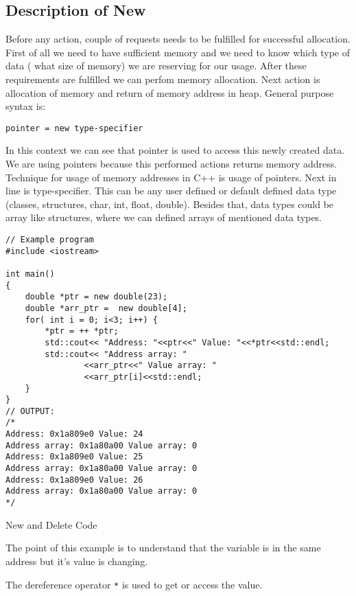 \documentclass[11pt, a4paper]{article}
\begin{document}
\subsection{Description of New}%
\label{sub:description_of_new}

Before any action, couple of requests needs to be fulfilled for successful allocation. First of all we need to have sufficient memory and we need to know which type of data ( what size of memory) we are reserving for our usage. After these requirements are fulfilled we can perfom memory allocation. Next action is allocation of memory and return of memory address in heap.
General purpose syntax is:

\texttt{pointer = new type-specifier} 

In this context we can see that pointer is used to access this newly created data. We are using pointers because this performed actions returns memory address. Technique for usage of memory addresses in C++ is usage of pointers. Next in line is type-specifier. This can be any user defined or default defined data type (classes, structures, char, int, float, double). Besides that, data types could be array like structures, where we can defined arrays of mentioned data types.


\begin{listing}
\begin{verbatim}
// Example program
#include <iostream>

int main()
{
    double *ptr = new double(23);
    double *arr_ptr =  new double[4];
    for( int i = 0; i<3; i++) {
        *ptr = ++ *ptr;
        std::cout<< "Address: "<<ptr<<" Value: "<<*ptr<<std::endl;
        std::cout<< "Address array: "
				<<arr_ptr<<" Value array: "
				<<arr_ptr[i]<<std::endl;
    }
}
// OUTPUT: 
/*
Address: 0x1a809e0 Value: 24
Address array: 0x1a80a00 Value array: 0
Address: 0x1a809e0 Value: 25
Address array: 0x1a80a00 Value array: 0
Address: 0x1a809e0 Value: 26
Address array: 0x1a80a00 Value array: 0
*/
\end{verbatim}
\caption{New and Delete Code}
\label{lst:new_and_delete}
\end{listing}


The point of this example is to understand that the variable is in the same address but it's value is changing. 

The dereference operator \texttt{*} is used to get or access the value. 
\end{document}
